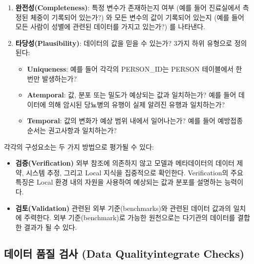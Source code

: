 \documentclass[11pt]{book}
\providecommand{\tightlist}{%
  \setlength{\itemsep}{0pt}\setlength{\parskip}{0pt}}
\theoremstyle{definition}
\theoremstyle{definition}
\theoremstyle{definition}
\theoremstyle{remark}
\begin{document}
\begin{enumerate}
\def\labelenumi{\arabic{enumi}.}
\setcounter{enumi}{1}
\tightlist
\item
  \textbf{완전성(Completeness)}: 특정 변수가 존재하는지 여부 (예를 들어
  진료실에서 측정된 체중이 기록되어 있는가?) 와 모든 변수의 값이
  기록되어 있는지 (예를 들어 모든 사람이 성별에 관련된 데이터를 가지고
  있는가?) 를 나타낸다.
\item
  \textbf{타당성(Plausibility)}: 데이터의 값을 믿을 수 있는가? 3가지
  하위 유형으로 정의된다:

  \begin{itemize}
  \tightlist
  \item
    \textbf{Uniqueness}: 예를 들어 각각의 PERSON\_ID는 PERSON 테이블에서
    한 번만 발생하는가?
  \item
    \textbf{Atemporal}: 값, 분포 또는 밀도가 예상되는 값과 일치하는가?
    예를 들어 데이터에 의해 암시된 당뇨병의 유행이 실제 알려진 유행과
    일치하는가?
  \item
    \textbf{Temporal}: 값의 변화가 예상 범위 내에서 일어나는가? 예를
    들어 예방접종 순서는 권고사항과 일치하는가?
  \end{itemize}

   
\end{enumerate}

각각의 구성요소는 두 가지 방법으로 평가될 수 있다:

\begin{itemize}
\tightlist
\item
  \textbf{검증(Verification)} 외부 참조에 의존하지 않고 모델과
  메타데이터의 데이터 제약, 시스템 추정, 그리고 Local 지식을 집중적으로
  확인한다. Verification의 주요 특징은 Local 환경 내의 자원을 사용하여
  예상되는 값과 분포를 설명하는 능력이다.
\item
  \textbf{검토(Validation)} 관련된 외부 기준(benchmarks)와 관련된 데이터
  값과의 일치에 주력한다. 외부 기준(benchmark)로 가능한 원천으로는
  다기관의 데이터를 결합한 결과가 될 수 있다.
\end{itemize}

 

\subsection{데이터 품질 검사 (Data Qualityintegrate
Checks)}\label{---data-qualityintegrate-checks}
\end{document}
